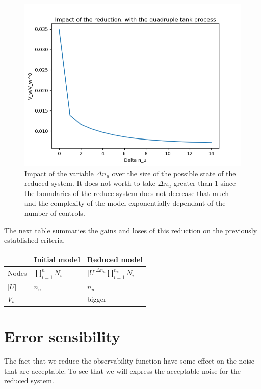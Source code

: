 \documentclass{article}
\theoremstyle{named}
\begin{document}
\begin{figure}[!ht]
  \centering
  \includegraphics[width=0.9\linewidth]{lin_sys_reduction_seq_control_len}
  \caption{Impact of the variable $\Delta n_u$ over the size of the possible state of the reduced system. It does not worth to take $\Delta n_u$ greater than 1 since the boundaries of the reduce system does not decrease that much and the complexity of the model exponentially dependant of the number of controls.}
  \label{reduced_system_bounds}
\end{figure}

The next table summaries the gains and loses of this reduction on the previously established criteria.

\begin{tabular}{ l|ll }
& Initial model & Reduced model\\ \hline
Nodes & $\prod_{i=1}^n N_i$ & $\left | U \right |^{\Delta n_u} \prod_{i=1}^{n_c} N_i $\\ 
$|U|$ & $n_u$ & $n_u$\\
$V_w$ &  & bigger \\
\end{tabular}

\section{Error sensibility}
The fact that we reduce the observability function have some effect on the noise that are acceptable.
To see that we will express the acceptable noise for the reduced system.
\end{document}
